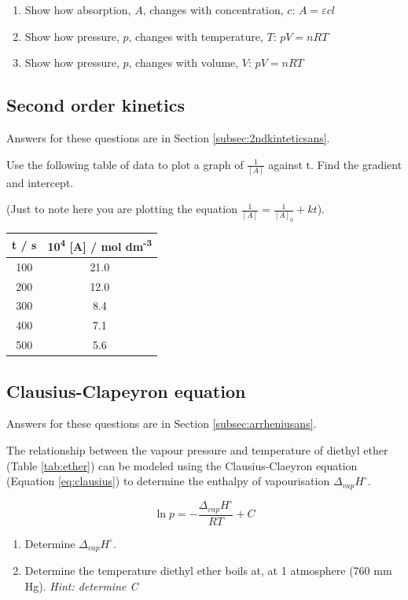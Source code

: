 \documentclass[
]{book}
\providecommand{\tightlist}{%
  \setlength{\itemsep}{0pt}\setlength{\parskip}{0pt}}
\begin{document}
\begin{enumerate}
\def\labelenumi{\arabic{enumi}.}
\item
  Show how absorption, \(A\), changes with concentration, \(c\): \(A = \varepsilon c l\)
\item
  Show how pressure, \(p\), changes with temperature, \(T\): \(pV = nRT\)
\item
  Show how pressure, \(p\), changes with volume, \(V\): \(pV = nRT\)
\end{enumerate}

\hypertarget{subsec:2ndkintetics}{%
\subsection{Second order kinetics}\label{subsec:2ndkintetics}}

Answers for these questions are in Section \ref{subsec:2ndkinteticsans}.

Use the following table of data to plot a graph of \(\frac{1}{[A]}\) against t. Find the gradient and intercept.

(Just to note here you are plotting the equation \(\frac{1}{[A]}=\frac{1}{[A]_0}+kt\)).

\begin{longtable}[]{@{}cc@{}}
\toprule
t / s & 10\textsuperscript{4} {[}A{]} / mol dm\textsuperscript{-3}\tabularnewline
\midrule
\endhead
100 & 21.0\tabularnewline
200 & 12.0\tabularnewline
300 & 8.4\tabularnewline
400 & 7.1\tabularnewline
500 & 5.6\tabularnewline
\bottomrule
\end{longtable}

\hypertarget{subsec:clausius}{%
\subsection{Clausius-Clapeyron equation}\label{subsec:clausius}}

Answers for these questions are in Section \ref{subsec:arrheniusans}.

The relationship between the vapour pressure and temperature of diethyl ether (Table \ref{tab:ether}) can be modeled using the Clausius-Claeyron equation (Equation \eqref{eq:clausius}) to determine the enthalpy of vapourisation \(\Delta _{vap}H^\circ\).

\begin{equation}
\ln p = -\frac{\Delta_{vap}H^\circ}{RT}+C
\label{eq:clausius}
\end{equation}

\begin{enumerate}
\def\labelenumi{\arabic{enumi}.}
\tightlist
\item
  Determine \(\Delta _{vap}H^\circ\).
\item
  Determine the temperature diethyl ether boils at, at 1 atmosphere (760 mm Hg). \emph{Hint: determine C}
\end{enumerate}
\end{document}
